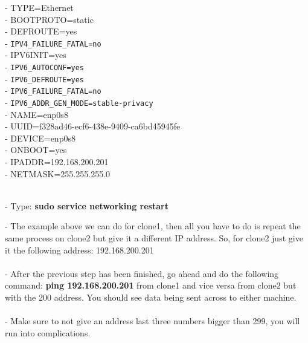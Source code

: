 \documentclass[11pt, a4papper]{article}
\begin{document}
\begin{adjustwidth}{3cm}{}
\begin{adjustwidth}{1cm}{}
\indent - TYPE=Ethernet \\
\indent - BOOTPROTO=static \\
\indent - DEFROUTE=yes \\
\indent - \texttt{IPV4\_FAILURE\_FATAL=no} \\
\indent - IPV6INIT=yes \\
\indent - \texttt{IPV6\_AUTOCONF=yes} \\
\indent - \texttt{IPV6\_DEFROUTE=yes} \\
\indent - \texttt{IPV6\_FAILURE\_FATAL=no} \\
\indent - \texttt{IPV6\_ADDR\_GEN\_MODE=stable-privacy} \\
\indent - NAME=enp0s8 \\
\indent - UUID=f328ad46-ecf6-438e-9409-ca6bd45945fe \\
\indent - DEVICE=enp0s8 \\
\indent - ONBOOT=yes \\
\indent - IPADDR=192.168.200.201 \\
\indent - NETMASK=255.255.255.0 \\ \\
\end{adjustwidth}
\noindent - Type: \textbf{sudo service networking restart} \\
\begin{adjustwidth}{1cm}{}
\indent - The example above we can do for clone1, then all you have to do is repeat the same process on clone2 but give it a different IP address. So, for clone2 just give it the following address: 192.168.200.201 \\ \\
 - After the previous step has been finished, go ahead and do the following command: \textbf{ping 192.168.200.201} from clone1 and vice versa from clone2 but with the 200 address. You should see data being sent across to either machine. \\ \\
 - Make sure to not give an address last three numbers bigger than 299, you will run into complications.
 \end{adjustwidth}
\end{adjustwidth}
\end{document}
